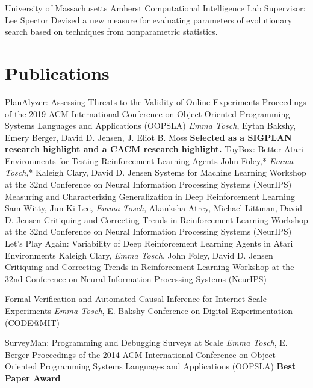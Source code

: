 \documentclass[11pt,a4paper,sans]{moderncv} %
\newcommand{\umass}{University of Massachusetts Amherst}
\newcommand{\me}{\emph{Emma Tosch}}
\begin{document}
  {\umass{}}
  {Computational Intelligence Lab}
  {Supervisor: Lee Spector}
  {Devised a new measure for evaluating parameters of evolutionary search based on techniques from nonparametric statistics.}
  

\section{Publications}
  {PlanAlyzer: Assessing Threats to the Validity of Online Experiments}
  {Proceedings of the 2019 ACM International Conference on Object Oriented Programming Systems Languages and Applications (OOPSLA)}
  {\me{}, Eytan Bakshy, Emery Berger, David D. Jensen, J. Eliot B. Moss}
  {}
  {\textbf{Selected as a SIGPLAN research highlight and a CACM research highlight.}}
  {ToyBox: Better Atari Environments for Testing Reinforcement Learning Agents}
  {John Foley,* \me{},* Kaleigh Clary, David D. Jensen}
  {Systems for Machine Learning Workshop at the 32nd Conference on Neural Information Processing Systems (NeurIPS)}
  {}
  {}
  {Measuring and Characterizing Generalization in Deep Reinforcement Learning}
  {Sam Witty, Jun Ki Lee, \me{}, Akanksha Atrey, Michael Littman, David D. Jensen}
  {Critiquing and Correcting Trends in Reinforcement Learning Workshop at the 32nd Conference on Neural Information Processing Systems (NeurIPS)}
  {}
  {}
{Let's Play Again: Variability of Deep Reinforcement Learning Agents in Atari Environments}
{Kaleigh Clary, \me{}, John Foley, David D. Jensen}
  {Critiquing and Correcting Trends in Reinforcement Learning Workshop at the 32nd Conference on Neural Information Processing Systems (NeurIPS)}
  {}
  {}

  {Formal Verification and Automated Causal Inference for Internet-Scale Experiments}
  {\me{}, E. Bakshy}
  {Conference on Digital Experimentation (CODE@MIT)}
  {}
  {}

  {SurveyMan: Programming and Debugging Surveys at Scale}
  {\me{}, E. Berger} 
  {Proceedings of the 2014 ACM International Conference on Object Oriented Programming Systems Languages and Applications (OOPSLA)}
  {}
  {\textbf{Best Paper Award}}
  
\end{document}
